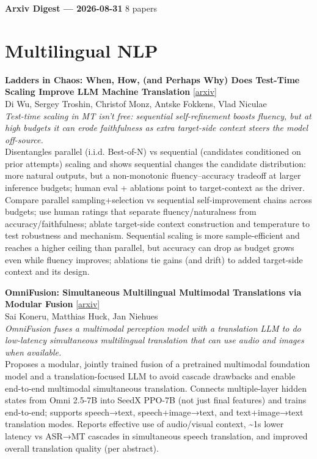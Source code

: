 \documentclass[12pt,letterpaper]{article}
\begin{document}
{\footnotesize\textbf{Arxiv Digest --- 2026-08-31} \hfill 8 papers}

\smallskip

\section*{Multilingual NLP}

{\small\textbf{Ladders in Chaos: When, How, (and Perhaps Why) Does Test-Time Scaling Improve LLM Machine Translation}} {\scriptsize[\href{https://arxiv.org/abs/2608.28496}{arxiv}]}\\
{\scriptsize Di Wu, Sergey Troshin, Christof Monz, Antske Fokkens, Vlad Niculae}\\

{\small\textit{Test-time scaling in MT isn't free: sequential self-refinement boosts fluency, but at high budgets it can erode faithfulness as extra target-side context steers the model off-source.}}\\[1pt]
{\footnotesize Disentangles parallel (i.i.d. Best-of-N) vs sequential (candidates conditioned on prior attempts) scaling and shows sequential changes the candidate distribution: more natural outputs, but a non-monotonic fluency--accuracy tradeoff at larger inference budgets; human eval + ablations point to target-context as the driver. Compare parallel sampling+selection vs sequential self-improvement chains across budgets; use human ratings that separate fluency/naturalness from accuracy/faithfulness; ablate target-side context construction and temperature to test robustness and mechanism. Sequential scaling is more sample-efficient and reaches a higher ceiling than parallel, but accuracy can drop as budget grows even while fluency improves; ablations tie gains (and drift) to added target-side context and its design.}

\medskip

{\small\textbf{OmniFusion: Simultaneous Multilingual Multimodal Translations via Modular Fusion}} {\scriptsize[\href{https://arxiv.org/abs/2512.00234}{arxiv}]}\\
{\scriptsize Sai Koneru, Matthias Huck, Jan Niehues}\\

{\small\textit{OmniFusion fuses a multimodal perception model with a translation LLM to do low-latency simultaneous multilingual translation that can use audio and images when available.}}\\[1pt]
{\footnotesize Proposes a modular, jointly trained fusion of a pretrained multimodal foundation model and a translation-focused LLM to avoid cascade drawbacks and enable end-to-end multimodal simultaneous translation. Connects multiple-layer hidden states from Omni 2.5-7B into SeedX PPO-7B (not just final features) and trains end-to-end; supports speech→text, speech+image→text, and text+image→text translation modes. Reports effective use of audio/visual context, \textasciitilde{}1s lower latency vs ASR→MT cascades in simultaneous speech translation, and improved overall translation quality (per abstract).}
\end{document}
